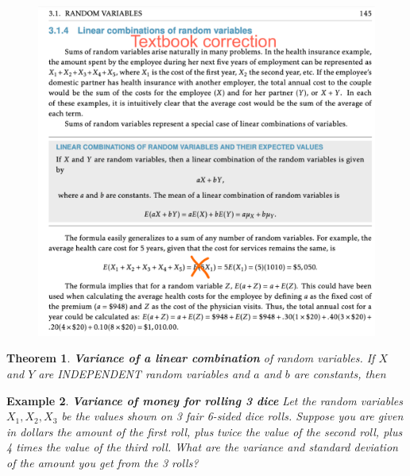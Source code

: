 \documentclass[12pt]{amsart}
\newtheorem{theorem}{Theorem}[section]
\newtheorem{example}[theorem]{Example}
\begin{document}
{\begin{figure}[h!]
  \includegraphics[width=7in]{img/VH_LinearCombo_E[5X]_error.pdf}
  \label{fig:BookError}
\end{figure}



\newpage
\begin{theorem}{\textbf{Variance of a linear combination} of random variables.} \newline
If $X$ and $Y$ are INDEPENDENT random variables and $a$ and $b$ are constants, then 
\vspace{3.5cm}


\end{theorem}

\begin{example}  \textbf{Variance of money for rolling 3 dice} \newline
Let the random variables $X_1, X_2, X_3$ be the values shown on 3 fair 6-sided dice rolls. \newline 
Suppose you are given in dollars the amount of the first roll, plus twice the value of the second roll, plus 4 times the value of the third roll. \newline 
What are the variance and standard deviation of the amount you get from the 3 rolls?  \newline 



\end{example}}
\end{document}
